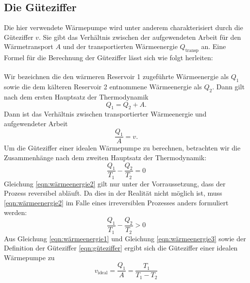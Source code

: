 \documentclass{scrartcl} %
\begin{document}
  \subsection{Die Güteziffer}
  \label{sec:güteziffer}
  Die hier verwendete Wärmepumpe wird unter anderem charakterisiert durch die Güteziffer $ v $. Sie gibt das Verhältnis zwischen der aufgewendeten Arbeit für den Wärmetransport
  $ A $ und der transportierten Wärmeenergie $ Q_\text{transp} $ an. Eine Formel für die Berechnung der Güteziffer lässt sich wie folgt herleiten: \\
  \\
  Wir bezeichnen die den wärmeren Reservoir 1 zugeführte Wärmeenergie als $ Q_\text{1} $ sowie die dem kälteren Reservoir 2 entnommene Wärmeenergie als $ Q_\text{2} $.
  Dann gilt nach dem ersten Hauptsatz der Thermodynamik
  \begin{equation}
    Q_\text{1} = Q_\text{2} + A.
    \label{eqn:wärmeenergie1}
  \end{equation}
  Dann ist das Verhältnis zwischen transportierter Wärmeenergie und aufgewendeter Arbeit
  \begin{equation}
    \frac{Q_\text{1}}{A} = v.
    \label{eqn:güteziffer}
  \end{equation}
  Um die Güteziffer einer idealen Wärmepumpe zu berechnen, betrachten wir die Zusammenhänge nach dem zweiten Hauptsatz der Thermodynamik:
  \begin{equation}
    \frac{Q_\text{1}}{T_\text{1}} - \frac{Q_\text{2}}{T_\text{2}} = 0
    \label{eqn:wärmeenergie2}
  \end{equation}
  Gleichung \eqref{eqn:wärmeenergie2} gilt nur unter der Vorraussetzung, dass der Prozess reversibel abläuft.
  Da dies in der Realität nicht möglich ist, muss \eqref{eqn:wärmeenergie2} im Falle eines irreversiblen Prozesses
  anders formuliert werden:
  \begin{equation}
  	\frac{Q_\text{1}}{T_\text{1}} - \frac{Q_\text{2}}{T_\text{2}} > 0
  	\label{eqn:wärmeenergie3}
  \end{equation}
	Aus Gleichung \eqref{eqn:wärmeenergie1} und Gleichung \eqref{eqn:wärmeenergie3} sowie der Definition der Güteziffer
	\eqref{eqn:güteziffer} ergibt sich die Güteziffer einer idealen Wärmepumpe zu
	\begin{equation}
		v_\text{ideal} = \frac{Q_\text{1}}{A} = \frac{T_\text{1}}{T_\text{1} - T_\text{2}}
		\label{eqn:idealegüteziffer}
	\end{equation}
\end{document}
